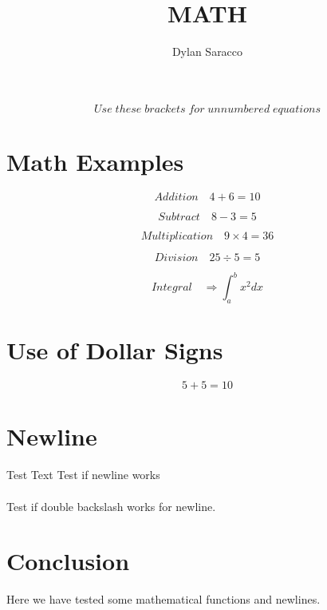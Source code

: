 \documentclass{article}
\title{MATH}
\author{Dylan Saracco}
\numberwithin{equation}{section}
\begin{document}
	\maketitle
	
	\[ Use \; these \; brackets \; for \; unnumbered \; equations \]
	
	
	\section{Math Examples}

	\begin{equation}
	Addition \quad 4 + 6 = 10
	\label{eq:add}
	\end{equation} 
	
	\begin{equation}
	Subtract \quad 8 - 3 = 5 
	\label{eq:sub}
	\end{equation}
	
	\begin{equation}	
	Multiplication \quad 9 \times 4 = 36 
	\label{eq:mult}
	\end{equation}
	
	\begin{equation}
	Division \quad 25 \div 5 = 5  
	\label{eq:div}
	\end{equation}
	
	\begin{equation}
	Integral \quad \Rightarrow \int_{a}^{b} x^2 dx	
	\end{equation}
	
	\section{Use of Dollar Signs}
	
	$$ 5 + 5 = 10 $$
	
	\section{Newline}
	Test Text
	\newline
	Test if newline works
	\\
	\\
	Test if double backslash works for newline. 
	\\
	\section{Conclusion}
	
	Here we have tested some mathematical functions and newlines. 
\end{document}
